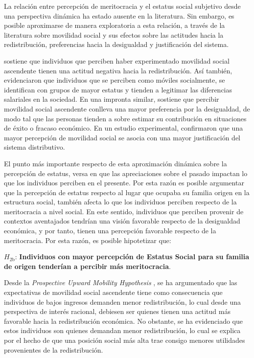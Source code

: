 \documentclass[12pt]{article}
\begin{document}
La relación entre percepción de meritocracia y el estatus social subjetivo desde una perspectiva dinámica ha estado ausente en la literatura. Sin embargo, es posible aproximarse de manera exploratoria a esta relación, a través de la literatura sobre movilidad social y sus efectos sobre las actitudes hacia la redistribución, preferencias hacia la desigualdad y justificación del sistema.       

\citet{Jaime-Castillo2008} sostiene que individuos que perciben haber experimentado movilidad social ascendente tienen una actitud negativa hacia la redistribución. Así también, \cite{Kelley2009} evidenciaron que individuos que se perciben como móviles socialmente, se identifican con grupos de mayor estatus y tienden a legitimar las diferencias salariales en la sociedad. En una impronta similar, \cite{Gugushvili2016a} sostiene que percibir movilidad social ascendente conlleva una mayor preferencia por la desigualdad, de modo tal que las personas tienden a sobre estimar su contribución en situaciones de éxito o fracaso económico. En un estudio experimental, \cite{Day2017} confirmaron que una mayor percepción de movilidad social se asocia con una mayor justificación del sistema distributivo.    
 
El punto más importante respecto de esta aproximación dinámica sobre la percepción de estatus, versa en que las apreciaciones sobre el pasado impactan lo que los individuos perciben en el presente. Por esta razón es posible argumentar que la percepción de estatus respecto al  lugar que ocupaba su familia origen en la estructura social, también afecta lo que los individuos perciben respecto de la meritocracia a nivel social. En este sentido, individuos que perciben provenir de contextos aventajados tendrían una visión favorable respecto de la desigualdad económica, y por tanto, tienen una percepción favorable respecto de la meritocracia. Por esta razón, es posible hipotetizar que:   


$H_{\text{2b}}$: \textbf{Individuos con mayor percepción de Estatus Social para su familia de origen tenderían a percibir más meritocracia}.

Desde la \emph{Prospective Upward Mobility Hypothesis} \citep{Benabou2001,Alesina2005}, se ha argumentado que las expectativas de movilidad social ascendente tiene como consecuencia que individuos de bajos ingresos demanden menor redistribución, lo cual desde una perspectiva de interés racional, debiesen ser quienes tienen una actitud más favorable hacia la redistribución económica. No obstante, se ha evidenciado que estos individuos son quienes demandan menor redistribución, lo cual se explica por el hecho de que una posición social más alta trae consigo menores utilidades provenientes de la redistribución.  
\end{document}
